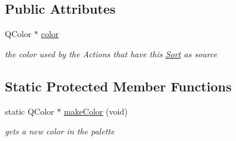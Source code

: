 \subsection*{\-Public \-Attributes}
\begin{DoxyCompactItemize}
\item 
\hypertarget{class_g_sort_afdedfe6a6028c586a755315351eee309}{\-Q\-Color $\ast$ \hyperlink{class_g_sort_afdedfe6a6028c586a755315351eee309}{color}}\label{class_g_sort_afdedfe6a6028c586a755315351eee309}

\begin{DoxyCompactList}\small\item\em the color used by the \-Actions that have this \hyperlink{class_sort}{\-Sort} as source \end{DoxyCompactList}\end{DoxyCompactItemize}
\subsection*{\-Static \-Protected \-Member \-Functions}
\begin{DoxyCompactItemize}
\item 
static \-Q\-Color $\ast$ \hyperlink{class_g_sort_a03da0205abd58bad6c4a58419cb40568}{make\-Color} (void)
\begin{DoxyCompactList}\small\item\em gets a new color in the palette \end{DoxyCompactList}\end{DoxyCompactItemize}

